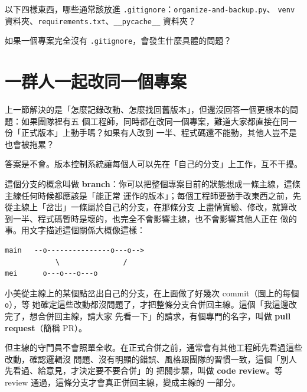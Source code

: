 
\begin{drills}[label=drills:gitignore]
\item 以下四樣東西，哪些通常該放進 \texttt{.gitignore}：\texttt{organize-and-backup.py}、
\texttt{venv} 資料夾、\texttt{requirements.txt}、\texttt{\_\_pycache\_\_} 資料夾？
\item 如果一個專案完全沒有 \texttt{.gitignore}，會發生什麼具體的問題？
\end{drills}

\section{一群人一起改同一個專案}
\label{sec:version-control}

上一節解決的是「怎麼記錄改動、怎麼找回舊版本」，但還沒回答一個更根本的問題：如果團隊裡有五
個工程師，同時都在改同一個專案，難道大家都直接在同一份「正式版本」上動手嗎？如果有人改到
一半、程式碼還不能動，其他人豈不是也會被拖累？

答案是不會。版本控制系統讓每個人可以先在「自己的分支」上工作，互不干擾。

這個分支的概念叫做
\textbf{branch}：你可以把整個專案目前的狀態想成一條主線，這條主線任何時候都應該是「能正常
運作的版本」；每個工程師要動手改東西之前，先從主線上「岔出」一條屬於自己的分支，在那條分支
上盡情實驗、修改，就算改到一半、程式碼暫時是壞的，也完全不會影響主線，也不會影響其他人正在
做的事。用文字描述這個關係大概像這樣：

\begin{verbatim}
main   --o---------------o---o-->
            \               /
mei      o---o---o---o
\end{verbatim}

小美從主線上的某個點岔出自己的分支，在上面做了好幾次 commit（圖上的每個 \texttt{o}），等
她確定這些改動都沒問題了，才把整條分支合併回主線。這個「我這邊改完了，想合併回主線，請大家
先看一下」的請求，有個專門的名字，叫做 \textbf{pull request}（簡稱 PR）。

但主線的守門員不會照單全收。在正式合併之前，通常會有其他工程師先看過這些改動，確認邏輯沒
問題、沒有明顯的錯誤、風格跟團隊的習慣一致，這個「別人先看過、給意見，才決定要不要合併」的
把關步驟，叫做 \textbf{code review}。等 review 通過，這條分支才會真正併回主線，變成主線的
一部分。

